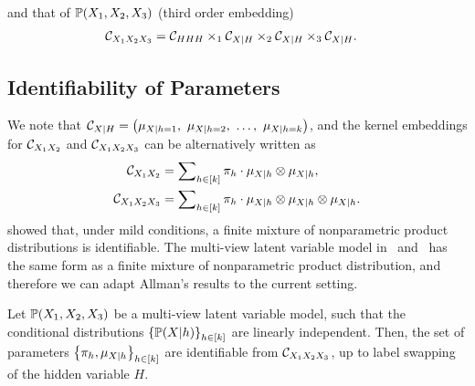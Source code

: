 \documentclass{article}
\begin{document}
and that of $\mathbb{P}(X_1,X_2,X_3)$ (third order embedding)
\begin{align}
  &\mathcal{C}_{X_1 X_2 X_3}
  = \mathcal{C}_{HHH} \times_1 \mathcal{C}_{X|H} \times_2 \mathcal{C}_{X|H} \times_3 \mathcal{C}_{X|H}. \label{eq:triple_factorization}
\end{align}

\vspace{-3mm}
\subsection{Identifiability of Parameters}
\vspace{-2mm}

We note that $\mathcal{C}_{X|H} = \left(\mu_{X|h=1},\ \mu_{X|h=2},\ \ldots,\ \mu_{X|h=k}\right)$, and the kernel embeddings for $\mathcal{C}_{X_1 X_2}$ and $\mathcal{C}_{X_1 X_2 X_3}$ can be alternatively written as
\begin{align}
	\mathcal{C}_{X_1 X_2}
  & = \sum\nolimits_{h \in [k]} \pi_h\cdot \mu_{X|h} \otimes \mu_{X|h}, \label{eq:joint2} \\
  \mathcal{C}_{X_1 X_2 X_3}
  &= \sum\nolimits_{h \in [k]} \pi_h\cdot \mu_{X|h} \otimes \mu_{X|h} \otimes \mu_{X|h}. \label{eq:joint3}
\end{align}
\citet{AllMatRho09} showed that, under mild conditions, a finite mixture of nonparametric product distributions is identifiable. The multi-view latent variable model in~ and~ has the same form as a finite mixture of nonparametric product distribution, and therefore we can adapt Allman's results to the current setting.
\begin{proposition}[Identifiability]\label{prop:identifiability}
\vspace{-2mm}
  Let $\mathbb{P}(X_1,X_2,X_3)$ be a multi-view latent variable model, such that the conditional distributions $\left\{\mathbb{P}(X|h)\right\}_{h \in [k]}$ are linearly independent. Then, the set of parameters $\left\{\pi_h, \mu_{X|h}\right\}_{h \in [k]}$ are identifiable from $\mathcal{C}_{X_1 X_2 X_3}$, up to label swapping of the hidden variable $H$.
\vspace{-2mm}
\end{proposition}
\end{document}
